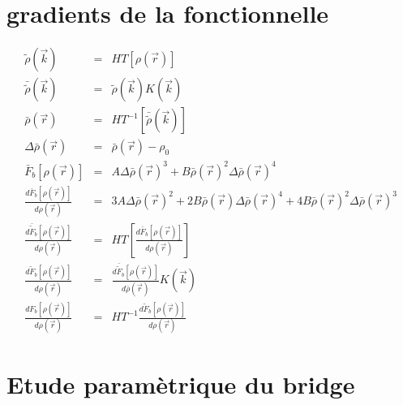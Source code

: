 \section{gradients de la fonctionnelle} \label{app:grad}

\begin{eqnarray}
\widetilde{\rho}(\vec{k})&=&HT[\rho(\vec{r})]  \\
\bar{\widetilde{\rho}}(\vec{k})&=&\widetilde{\rho}(\vec{k})K(\vec{k})   \\
\bar{\rho}(\vec{r})&=&HT^{-1}[\bar{\widetilde{\rho}}(\vec{k})]  \\
\Delta\bar{\rho}(\vec{r})&=&\bar{\rho}(\vec{r})-\rho_{0}  \\
\bar{F}_{b}[\rho(\vec{r})]&=&A\Delta\bar{\rho}(\vec{r})^{3}+B\bar{\rho}(\vec{r})^{2}\Delta\bar{\rho}(\vec{r})^{4}  \\
\frac{d\bar{F}_{b}[\rho(\vec{r})]}{d\rho(\vec{r})}&=&3A\Delta\bar{\rho}(\vec{r})^{2}+2B\bar{\rho}(\vec{r})\Delta\bar{\rho}(\vec{r})^{4}+4B\bar{\rho}(\vec{r})^{2}\Delta\bar{\rho}(\vec{r})^{3}  \\
\frac{d\bar{\widetilde{F}}_{b}[\rho(\vec{r})]}{d\rho(\vec{r})}&=&HT[\frac{d\bar{F}_{b}[\rho(\vec{r})]}{d\rho(\vec{r})}]  \\
\frac{d\widetilde{F}_{b}[\rho(\vec{r})]}{d\rho(\vec{r})}&=&\frac{d\bar{\widetilde{F}}_{b}[\rho(\vec{r})]}{d\bar{\rho}(\vec{r})}K(\vec{k})  \\
\frac{dF_{b}[\rho(\vec{r})]}{d\rho(\vec{r})}&=&HT^{-1}\frac{d\widetilde{F}_{b}[\rho(\vec{r})]}{d\rho(\vec{r})} 
\end{eqnarray}



\section{Etude paramètrique du bridge} \label{app:etudeParam}

